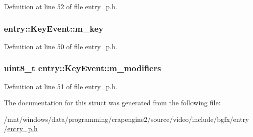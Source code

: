 Definition at line 52 of file entry\+\_\+p.\+h.

\hypertarget{structentry_1_1_key_event_a87db06183cecaa0b404c7214d8dc5352}{
\subsubsection[{m\+\_\+key}]{ entry\+::\+Key\+Event\+::m\+\_\+key}}\label{structentry_1_1_key_event_a87db06183cecaa0b404c7214d8dc5352}


Definition at line 50 of file entry\+\_\+p.\+h.

\hypertarget{structentry_1_1_key_event_a4e95b7d2d886451611a88c604bb69ff2}{
\subsubsection[{m\+\_\+modifiers}]{\setlength{\rightskip}{0pt plus 5cm}uint8\+\_\+t entry\+::\+Key\+Event\+::m\+\_\+modifiers}}\label{structentry_1_1_key_event_a4e95b7d2d886451611a88c604bb69ff2}


Definition at line 51 of file entry\+\_\+p.\+h.



The documentation for this struct was generated from the following file\+:\begin{DoxyCompactItemize}
\item 
/mnt/windows/data/programming/crapengine2/source/video/include/bgfx/entry/\hyperlink{entry__p_8h}{entry\+\_\+p.\+h}\end{DoxyCompactItemize}
